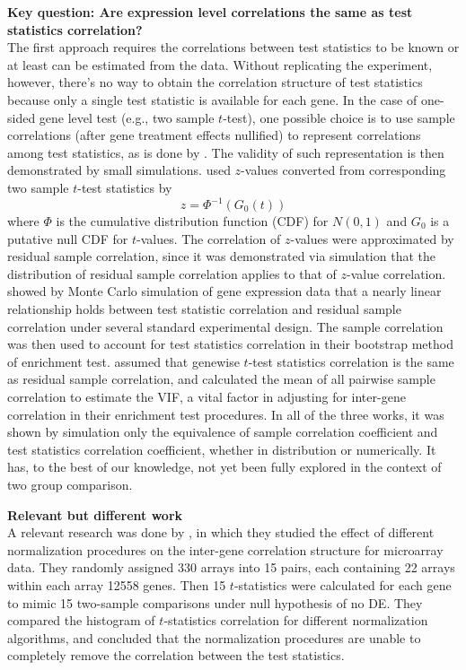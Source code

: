 \documentclass[12pt, a4paper]{article}
\begin{document}
	\textbf{Key question: Are  expression level correlations the same as test statistics correlation?}\\
	The first approach requires the correlations between test statistics to be known or at least can be estimated from the data. Without replicating the experiment, however, there's no way to obtain the correlation structure of test statistics because only a single test statistic is available for each gene. In the case of one-sided gene level test (e.g., two sample $t$-test), one possible choice is to use sample correlations (after gene treatment effects nullified) to represent correlations among test statistics, as is done by \citet{barry2008statistical, efron2007correlation, wu2012camera}. The validity of such representation is then demonstrated by small simulations. \citet{efron2007correlation} used $z$-values converted from corresponding two
	sample $t$-test statistics by 
	\begin{equation}\label{t2z}
		z  = \Phi^{-1}(G_0(t))
	\end{equation}
	where $\Phi$ is the cumulative distribution function (CDF) for $N(0, 1)$ and $G_0$ is a putative
	null CDF for $t$-values. The correlation of $z$-values were approximated by residual sample
	correlation, since it was demonstrated via simulation that the distribution of residual sample
	correlation applies to that of $z$-value correlation. \citet{barry2008statistical} showed by Monte
	Carlo simulation of gene expression data that a nearly linear relationship holds between test
	statistic correlation and residual sample correlation under several standard experimental design.
	The sample correlation was then used to account for test statistics correlation in their bootstrap
	method of enrichment test. \citet{wu2012camera} assumed that genewise $t$-test statistics correlation
	is the same as residual sample correlation, and calculated the mean of all pairwise sample
	correlation to estimate the VIF, a vital factor in adjusting for inter-gene correlation in their
	enrichment test procedures. In all of the three works, it was shown by simulation only the
	equivalence of sample correlation coefficient and test statistics correlation coefficient, whether
	in distribution or numerically. It has, to the best of our knowledge, not yet been fully explored in
	the context of two group comparison.
	
	\textbf{Relevant but different work}\\
	A relevant research was done by \citet{qiu2005effects}, in which they studied the effect of different
	normalization procedures on the inter-gene correlation structure for microarray data. They randomly
	assigned 330 arrays into 15 pairs, each containing 22 arrays within each array 12558 genes. Then 15
	$t$-statistics were calculated for each gene to mimic 15 two-sample comparisons under null
	hypothesis of no DE. They compared the histogram of $t$-statistics correlation for different
	normalization algorithms, and concluded that the normalization procedures are unable to completely
	remove the correlation between the test statistics. %
	
\end{document}
